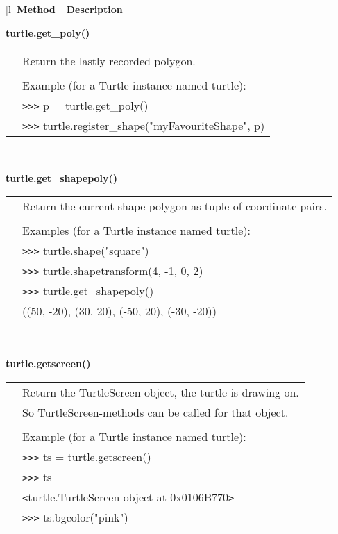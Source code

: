 \begin{center}
{\small
\begin{tabular}{|l|} \hline
{\bf Method~~Description}  \\ \hline\hline 

{\bf    turtle.get\_poly()} \\
   \begin{tabular}{p{0.25in}p{4in}}
&        Return the lastly recorded polygon. \\
&  \\
&        Example (for a Turtle instance named turtle): \\
&        \verb+>+\verb+>+\verb+>+ p = turtle.get\_poly() \\
&        \verb+>+\verb+>+\verb+>+ turtle.register\_shape("myFavouriteShape", p) \\
\end{tabular} \\ \hline

{\bf    turtle.get\_shapepoly()} \\
   \begin{tabular}{p{0.25in}p{4in}}
&        Return the current shape polygon as tuple of coordinate pairs. \\
&  \\
&        Examples (for a Turtle instance named turtle): \\
&        \verb+>+\verb+>+\verb+>+ turtle.shape("square") \\
&        \verb+>+\verb+>+\verb+>+ turtle.shapetransform(4, -1, 0, 2) \\
&        \verb+>+\verb+>+\verb+>+ turtle.get\_shapepoly() \\
&        ((50, -20), (30, 20), (-50, 20), (-30, -20)) \\
\end{tabular} \\ \hline

{\bf    turtle.getscreen()} \\
   \begin{tabular}{p{0.25in}p{4in}}
&        Return the TurtleScreen object, the turtle is drawing  on. \\
&        So TurtleScreen-methods can be called for that object. \\
&  \\
&        Example (for a Turtle instance named turtle): \\
&        \verb+>+\verb+>+\verb+>+ ts = turtle.getscreen() \\
&        \verb+>+\verb+>+\verb+>+ ts \\
&        \verb+<+turtle.TurtleScreen object at 0x0106B770\verb+>+ \\
&        \verb+>+\verb+>+\verb+>+ ts.bgcolor("pink") \\
\end{tabular} \\ \hline


\end{tabular}}
\end{center}
